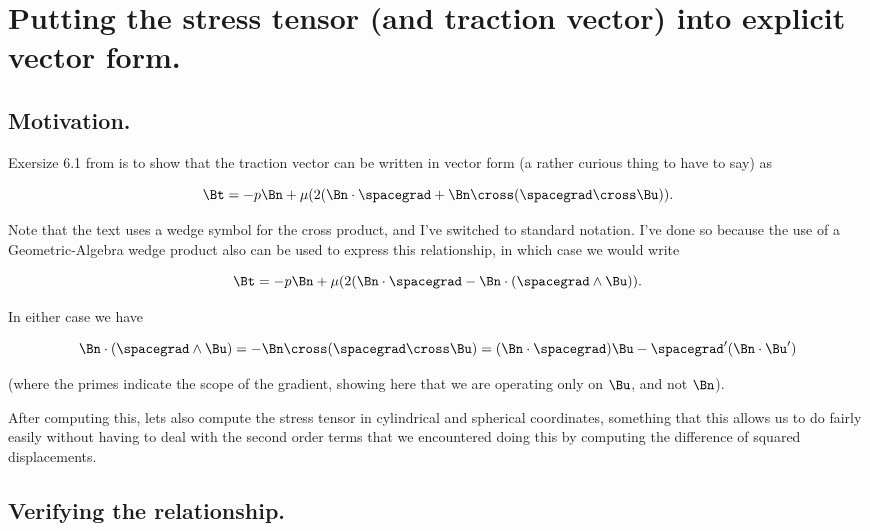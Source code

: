 
%

\chapter{Putting the stress tensor (and traction vector) into explicit vector form.}
\label{chap:continuumstressTensorVectorForm}
{}
\date{Apr 4, 2012}

\beginArtWithToc

\section{Motivation.}

Exersize 6.1 from \cite{acheson1990elementary} is to show that the traction vector can be written in vector form (a rather curious thing to have to say) as

\begin{equation}\label{eqn:stressTensorVectorForm:10}
\Bt = -p \Bn + \mu ( 2 ( \Bn \cdot \spacegrad + \Bn \cross (\spacegrad \cross \Bu)).
\end{equation}

Note that the text uses a wedge symbol for the cross product, and I've switched to standard notation.  I've done so because the use of a Geometric-Algebra wedge product also can be used to express this relationship, in which case we would write

\begin{equation}\label{eqn:stressTensorVectorForm:30}
\Bt = -p \Bn + \mu ( 2 ( \Bn \cdot \spacegrad - \Bn \cdot (\spacegrad \wedge \Bu)).
\end{equation}

In either case we have

\begin{equation}\label{eqn:stressTensorVectorForm:50}
\Bn \cdot (\spacegrad \wedge \Bu)
= 
-\Bn \cross (\spacegrad \cross \Bu)
=
(\Bn \cdot \spacegrad) \Bu -
\spacegrad' (\Bn \cdot \Bu')
\end{equation}

(where the primes indicate the scope of the gradient, showing here that we are operating only on $\Bu$, and not $\Bn$).

After computing this, lets also compute the stress tensor in cylindrical and spherical coordinates, something that this allows us to do fairly easily without having to deal with the second order terms that we encountered doing this by computing the difference of squared displacements.

\section{Verifying the relationship.}

\EndArticle
